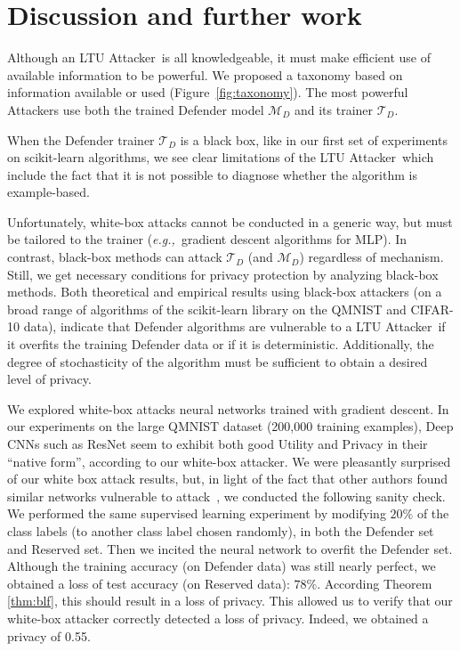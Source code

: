 \documentclass[letterpaper]{article}
\newcommand{\eg}{{\em e.g.,~}}
\newcommand{\oracle}{LTU Attacker~}
\begin{document}
\section{Discussion and further work}
\label{sec:discussion}

Although an \oracle is all knowledgeable, it must make efficient use of available information to be powerful. We proposed a taxonomy
based on information available or used (Figure~\ref{fig:taxonomy}). The most powerful Attackers use both the trained Defender model $\mathcal{M}_D$ and its trainer $\mathcal{T}_D$.

When the Defender trainer $\mathcal{T}_D$ is a black box, like in our first set of experiments on scikit-learn algorithms, we see clear limitations of the \oracle which include the fact that it is not possible to diagnose whether the algorithm is example-based.

Unfortunately, white-box attacks cannot be conducted in a generic way, but must be tailored to the trainer (\eg  gradient descent algorithms for MLP). In contrast, black-box methods can attack $\mathcal{T}_D$ (and $\mathcal{M}_D$) regardless of mechanism. Still, we get necessary conditions for privacy protection by analyzing black-box methods. Both theoretical and empirical results using black-box attackers (on a broad range of algorithms of the scikit-learn library on the QMNIST and CIFAR-10 data),
indicate that Defender algorithms are vulnerable to a \oracle if it overfits the training Defender data or if it is deterministic. Additionally, the degree of stochasticity of the algorithm must be sufficient to obtain a desired level of privacy.

We explored white-box attacks neural networks trained with gradient descent. In our experiments on the large QMNIST dataset (200,000 training examples),
Deep CNNs such as ResNet seem to exhibit both good Utility and Privacy in their ``native form'', according to our white-box attacker.
We were pleasantly surprised of our white box attack results, but, in light of the fact that other authors found similar networks vulnerable to attack~\cite{nasr2019comprehensive}, we conducted the following sanity check.
We performed the same supervised learning experiment by modifying \(20\%\) of the class labels (to another class label chosen randomly), in both the Defender set and Reserved set. Then we incited the neural network to overfit the Defender set. Although the training accuracy (on Defender data) was still nearly perfect, we obtained a loss of test accuracy (on Reserved data): $78\%$. According Theorem \ref{thm:blf}, this should result in a loss of privacy. This allowed us to verify that our white-box attacker correctly detected a loss of privacy. Indeed, we obtained a privacy of 0.55.
\end{document}
